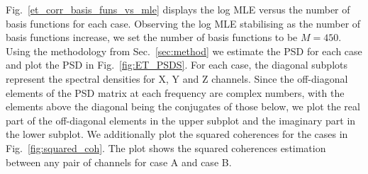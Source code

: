 \documentclass[%
 reprint,
 amsmath,amssymb,
 aps,
 nofootinbib,
]{revtex4-2}
\begin{document}
Fig.~\ref{et_corr_basis_funs_vs_mle} displays the log MLE versus the number of basis functions for each case. 
Observing the log MLE stabilising as the number of basis functions increase, we set the number of basis functions to be $M=450$.
Using the methodology from Sec.~\ref{sec:method} we estimate the PSD for each case and plot the PSD in Fig.~\ref{fig:ET_PSDS}. For each case, the diagonal subplots represent the spectral densities for X, Y and Z channels. Since the off-diagonal elements of the PSD matrix at each frequency are complex numbers, with the elements above the diagonal being the conjugates of those below, we plot the real part of the off-diagonal elements in the upper subplot and the imaginary part in the lower subplot.
We additionally plot the squared coherences for the cases in Fig.~\ref{fig:squared_coh}. The plot shows the squared coherences estimation between any pair of channels for case A and case B.
\end{document}
